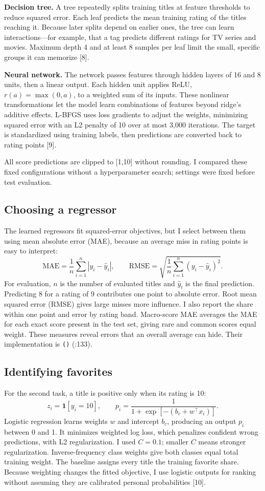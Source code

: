 \documentclass[10pt,a4paper]{article}
\newcommand{\codeptr}[3]{\texttt{\detokenize{#2}()} (\path{#1}:#3)}
\begin{document}
\textbf{Decision tree.} A tree repeatedly splits training titles at feature thresholds to reduce squared error. Each leaf predicts the mean training rating of the titles reaching it. Because later splits depend on earlier ones, the tree can learn interactions---for example, that a tag predicts different ratings for TV series and movies. Maximum depth 4 and at least 8 samples per leaf limit the small, specific groups it can memorize [8].

\textbf{Neural network.} The network passes features through hidden layers of 16 and 8 units, then a linear output. Each hidden unit applies ReLU, \(r(a)=\max(0,a)\), to a weighted sum of its inputs. These nonlinear transformations let the model learn combinations of features beyond ridge's additive effects. L-BFGS uses loss gradients to adjust the weights, minimizing squared error with an L2 penalty of 10 over at most 3,000 iterations. The target is standardized using training labels, then predictions are converted back to rating points [9].

All score predictions are clipped to [1,10] without rounding. I compared these fixed configurations without a hyperparameter search; settings were fixed before test evaluation.

\subsection*{Choosing a regressor}
The learned regressors fit squared-error objectives, but I select between them using mean absolute error (MAE), because an average miss in rating points is easy to interpret:
\[
\mathrm{MAE}=\frac{1}{n}\sum_{i=1}^{n}|y_i-\hat y_i|,
\qquad
\mathrm{RMSE}=\sqrt{\frac{1}{n}\sum_{i=1}^{n}(y_i-\hat y_i)^2}.
\]
For evaluation, \(n\) is the number of evaluated titles and \(\hat y_i\) is the final prediction. Predicting 8 for a rating of 9 contributes one point to absolute error. Root mean squared error (RMSE) gives large misses more influence. I also report the share within one point and error by rating band. Macro-score MAE averages the MAE for each exact score present in the test set, giving rare and common scores equal weight. These measures reveal errors that an overall average can hide. Their implementation is \codeptr{src/pipeline.py}{score_regression}{133}.

\subsection*{Identifying favorites}
For the second task, a title is positive only when its rating is 10:
\[
z_i=\mathbf{1}[y_i=10],\qquad
p_i=\frac{1}{1+\exp[-(b_c+w^\top x_i)]}.
\]
Logistic regression learns weights \(w\) and intercept \(b_c\), producing an output \(p_i\) between 0 and 1. It minimizes weighted log loss, which penalizes confident wrong predictions, with L2 regularization. I used \(C=0.1\); smaller \(C\) means stronger regularization. Inverse-frequency class weights give both classes equal total training weight. The baseline assigns every title the training favorite share. Because weighting changes the fitted objective, I use logistic outputs for ranking without assuming they are calibrated personal probabilities [10].
\end{document}
